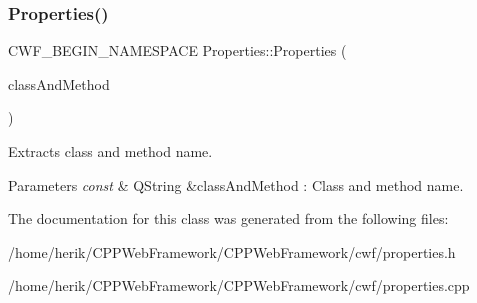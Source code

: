 \subsubsection{\texorpdfstring{Properties()}{Properties()}}
{\footnotesize\ttfamily C\+W\+F\+\_\+\+B\+E\+G\+I\+N\+\_\+\+N\+A\+M\+E\+S\+P\+A\+CE Properties\+::\+Properties (\begin{DoxyParamCaption}\item[{const Q\+String \&}]{class\+And\+Method }\end{DoxyParamCaption})\hspace{0.3cm}{\ttfamily [explicit]}}



Extracts class and method name. 


\begin{DoxyParams}{Parameters}
{\em const} & Q\+String \&class\+And\+Method \+: Class and method name. \\
\hline
\end{DoxyParams}


The documentation for this class was generated from the following files\+:\begin{DoxyCompactItemize}
\item 
/home/herik/\+C\+P\+P\+Web\+Framework/\+C\+P\+P\+Web\+Framework/cwf/properties.\+h\item 
/home/herik/\+C\+P\+P\+Web\+Framework/\+C\+P\+P\+Web\+Framework/cwf/properties.\+cpp\end{DoxyCompactItemize}
